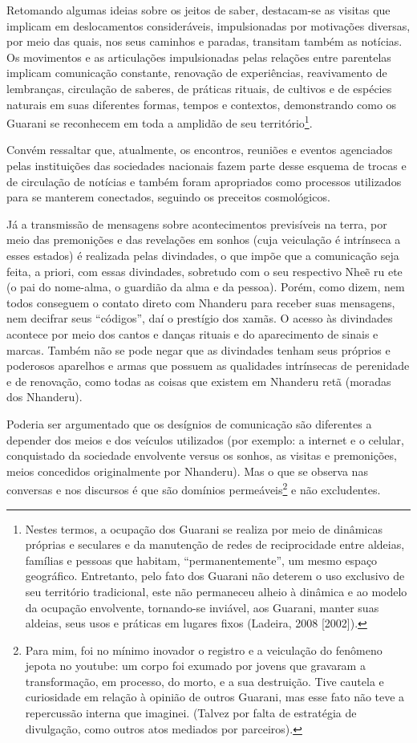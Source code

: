Retomando algumas ideias sobre os jeitos de saber, destacam-se as
visitas que implicam em deslocamentos consideráveis, impulsionadas por
motivações diversas, por meio das quais, nos seus caminhos e paradas,
transitam também as notícias. Os movimentos e as articulações
impulsionadas pelas relações entre parentelas implicam comunicação
constante, renovação de experiências, reavivamento de lembranças,
circulação de saberes, de práticas rituais, de cultivos e de espécies
naturais em suas diferentes formas, tempos e contextos, demonstrando
como os Guarani se reconhecem em toda a amplidão de seu
território\footnote{Nestes termos, a ocupação dos Guarani se realiza
por meio de dinâmicas próprias e seculares e da manutenção de redes de
reciprocidade entre aldeias, famílias e pessoas que habitam,
``permanentemente'', um mesmo espaço geográfico. Entretanto, pelo fato
dos Guarani não deterem o uso exclusivo de seu território tradicional,
este não permaneceu alheio à dinâmica e ao modelo da ocupação
envolvente, tornando-se inviável, aos Guarani, manter suas aldeias,
seus usos e práticas em lugares fixos (Ladeira, 2008 [2002]). }. 

Convém ressaltar que, atualmente, os encontros, reuniões e eventos
agenciados pelas instituições das sociedades nacionais fazem parte
desse esquema de trocas e de circulação de notícias e também foram
apropriados como processos utilizados para se manterem conectados,
seguindo os preceitos cosmológicos.

Já a transmissão de mensagens sobre acontecimentos previsíveis na terra,
por meio das premonições e das revelações em sonhos (cuja veiculação é
intrínseca a esses estados) é realizada pelas divindades, o que impõe
que a comunicação seja feita, a priori, com essas divindades, sobretudo
com o seu respectivo Nheẽ ru ete (o pai do nome-alma, o guardião
da alma e da pessoa). Porém, como dizem, nem todos conseguem o contato
direto com Nhanderu para receber suas mensagens, nem decifrar seus
``códigos'', daí o prestígio dos xamãs. O acesso às divindades acontece
por meio dos cantos e danças rituais e do aparecimento de sinais e
marcas. Também não se pode negar que as divindades tenham seus próprios
e poderosos aparelhos e armas que possuem as qualidades intrínsecas de
perenidade e de renovação, como todas as coisas que existem em Nhanderu
retã (moradas dos Nhanderu). 

Poderia ser argumentado que os desígnios de comunicação são diferentes a
depender dos meios e dos veículos utilizados (por exemplo: a internet e
o celular, conquistado da sociedade envolvente versus os sonhos, as
visitas e premonições, meios concedidos originalmente por Nhanderu).
Mas o que se observa nas conversas e nos discursos é que são domínios
permeáveis\footnote{Para mim, foi no mínimo inovador o registro e a
veiculação do fenômeno  jepota no youtube: um corpo foi exumado por
jovens que gravaram a transformação, em processo, do morto, e a sua
destruição. Tive cautela e curiosidade em relação à opinião de outros
Guarani, mas esse fato não teve a repercussão interna que imaginei.
(Talvez por falta de estratégia de divulgação, como outros atos
mediados por parceiros).} e não excludentes.

